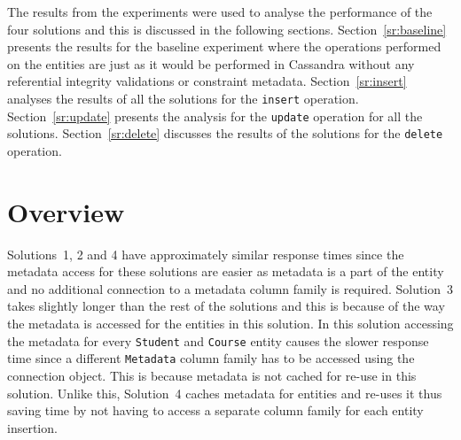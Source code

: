  The results from the experiments were used to
analyse the performance of the four solutions  and this is discussed in the
following sections. 
Section~\ref{sr:baseline} presents the results for the
baseline experiment where the operations performed on the entities are just as
it would be performed in Cassandra without any referential integrity validations
or constraint metadata.
Section~\ref{sr:insert} analyses the results of all the solutions for the
\texttt{insert} operation.
Section~\ref{sr:update} presents the analysis for the \texttt{update} operation
for all the solutions.
Section~\ref{sr:delete} discusses the results of the solutions for the
\texttt{delete} operation.

\newcommand{\Width}{0.5\textwidth}
\newcommand{\TB}[1]{\textbf{#1}}

\section{Overview}

  Solutions~1, 2  and 4 have approximately similar response times since the metadata 
  access for these solutions are easier as metadata is a part of the entity and 
  no additional connection to a metadata column family is required. Solution~3
  takes slightly longer than the rest of the solutions and this is because of the way
  the metadata is accessed for the entities in this solution. 
  In this solution accessing the metadata for every 
  \texttt{Student} and \texttt{Course} entity causes the slower
  response time since a different \texttt{Metadata} column family has to be
  accessed using the connection object. This is because metadata is not cached
  for re-use in this solution. Unlike this, Solution~4 caches  metadata for
  entities and re-uses it thus saving time by not having to access a separate
  column family for each entity insertion.
% 











